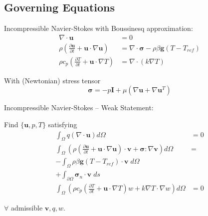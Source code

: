 \documentclass[compress,12pt]{beamer}
\newcommand{\bv}[1]{{\boldsymbol{#1}}}
\begin{document}
\subsection{Governing Equations}
\begin{frame}
  {
    Incompressible Navier-Stokes with Boussinesq approximation:
    \begin{align}
      \nonumber
      \nabla \cdot \bv{u} &= 0
      \\
      \nonumber 
      \rho\left( \frac{\partial \bv{u}}{\partial t} + \bv{u}\cdot \nabla \bv{u} \right) &=
      \nabla \cdot \bv{\sigma} -\rho\beta\bv{g}(T-T_{ref}) 
      \\
      \nonumber
      \rho c_p \left(\frac{\partial T}{\partial t} + \bv{u}\cdot\nabla T\right) &=
      \nabla \cdot (k\nabla T)
    \end{align}

    \vspace{0.25in}

    With (Newtonian) stress tensor %
    \begin{equation*}
      \bv{\sigma} = -p \bv{I} + \mu \left(\nabla \bv{u} + \nabla \bv{u}^T \right)
    \end{equation*}
  }

  
  {
    Incompressible Navier-Stokes -- Weak Statement:
    
    Find $\{\bv{u}, p, T\}$ satisfying
    \begin{align}
      \int_\Omega q \left( \nabla \cdot \bv{u}\right) d\Omega &= 0 
      \\
      \nonumber 
      \int_\Omega \left( \rho\left(
          \frac{\partial \bv{u}}{\partial t} + \bv{u} \cdot \nabla \bv{u}
	\right) \cdot \bv{v} + \bv{\sigma} : \nabla \bv{v} \right) d\Omega  &=
      \\ \nonumber
      - \int_\Omega \rho \beta \bv{g}(T-T_{ref})\cdot\bv{v} \; d\Omega&
      \\
      + \int_{\partial\Omega} \bv{\sigma}_n \cdot \bv{v} \; ds&
      \\
      \int_\Omega \left( \rho c_p \left(
          \frac{\partial T}{\partial t} + \bv{u} \cdot \nabla T
	\right) w + k \nabla T \cdot \nabla w \right) d\Omega &= 0
    \end{align}
    
    $\forall$ admissible $\bv{v}, q, w$.
  }
\end{frame}
\end{document}
